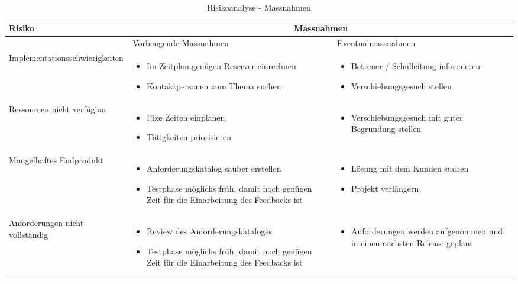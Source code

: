 \begin{table}[ht]
\centering
  \begin{tabular}{  l | p{4cm} | p{4cm} }
	\hline
	\rowcolor{darkgray}
	Risiko							&	\multicolumn{2}{|c|}{Massnahmen} \\ \hline
	\rowcolor{gray}
								&	Vorbeugende Massnahmen & Eventualmassnahmen	\\ \hline
	Implementationsschwierigkeiten
								&	\begin{itemize}
										\item Im Zeitplan genügen Reserver einrechnen
										\item Kontaktpersonen zum Thema suchen
									\end{itemize}
								&	\begin{itemize}
										\item Betreuer / Schulleitung informieren
										\item Verschiebungsgesuch stellen
									\end{itemize}						\\ \hline
	Ressourcen nicht verfügbar
								&	\begin{itemize}
										\item Fixe Zeiten einplanen
										\item Tätigkeiten priorisieren
									\end{itemize}
								&	\begin{itemize}
										\item Verschiebungsgesuch mit guter Begründung stellen
									\end{itemize}	\\ \hline
	Mangelhaftes Endprodukt		
								&	\begin{itemize}
										\item Anforderungskatalog sauber erstellen
										\item Testphase möglichs früh, damit noch genügen Zeit für die Einarbeitung des Feedbacks ist
									\end{itemize}
								&	\begin{itemize}
										\item Lösung mit dem Kunden suchen
										\item Projekt verlängern
									\end{itemize}	\\ \hline	
	Anforderungen nicht vollständig	
								&	\begin{itemize}
										\item Review des Anforderungskataloges
										\item Testphase möglichs früh, damit noch genügen Zeit für die Einarbeitung des Feedbacks ist
									\end{itemize}
								&	\begin{itemize}
										\item Anforderungen werden aufgenommen und in einen nächsten Release geplant											
									\end{itemize}	\\ \hline			
  \end{tabular}
   \caption{Risikoanalyse - Massnahmen}
\end{table}


